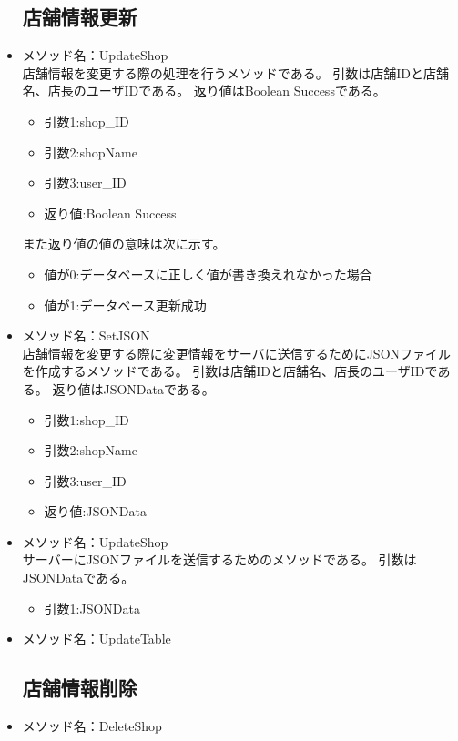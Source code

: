 \documentclass[a4j]{jarticle}
\begin{document}
\begin{itemize}
\subsection{店舗情報更新}



\item メソッド名：UpdateShop\\

店舗情報を変更する際の処理を行うメソッドである。
引数は店舗IDと店舗名、店長のユーザIDである。
返り値はBoolean Successである。
	\begin{itemize}
		\item 引数1:shop\_ID
		\item 引数2:shopName
		\item 引数3:user\_ID
		\item 返り値:Boolean Success
	\end{itemize}
また返り値の値の意味は次に示す。
	\begin{itemize}
		\item 値が0:データベースに正しく値が書き換えれなかった場合
		\item 値が1:データベース更新成功
	\end{itemize}

\item メソッド名：SetJSON\\

店舗情報を変更する際に変更情報をサーバに送信するためにJSONファイルを作成するメソッドである。
引数は店舗IDと店舗名、店長のユーザIDである。
返り値はJSONDataである。
	\begin{itemize}
		\item 引数1:shop\_ID
		\item 引数2:shopName
		\item 引数3:user\_ID
		\item 返り値:JSONData
	\end{itemize}
\item メソッド名：UpdateShop\\

サーバーにJSONファイルを送信するためのメソッドである。
引数はJSONDataである。
	\begin{itemize}
		\item 引数1:JSONData
	\end{itemize}
\item メソッド名：UpdateTable\\

\subsection{店舗情報削除}
%
\item メソッド名：DeleteShop\\


\end{itemize}
\end{document}
